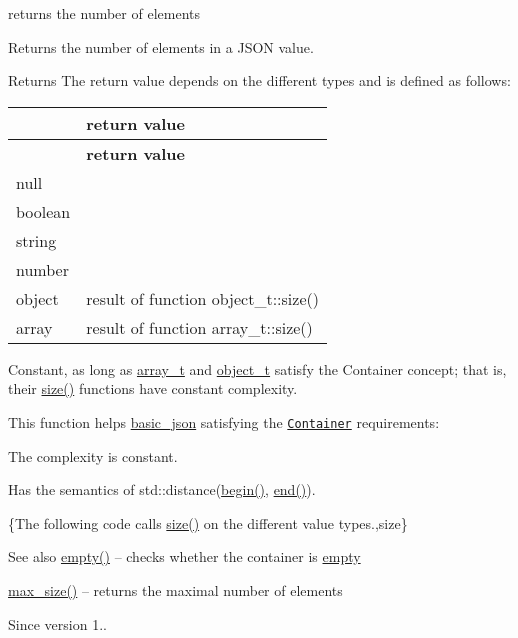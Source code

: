 returns the number of elements 

Returns the number of elements in a J\+S\+ON value.

\begin{DoxyReturn}{Returns}
The return value depends on the different types and is defined as follows\+: \tabulinesep=1mm
\begin{longtabu} spread 0pt [c]{*2{|X[-1]}|}
\hline
{}&{\bf return value  }\\
\endfirsthead
\hline
\endfoot
\hline
{}&{\bf return value  }\\
\endhead
null &{} \\
boolean &{} \\
string &{} \\
number &{} \\
object &result of function object\+\_\+t\+::size() \\
array &result of function array\+\_\+t\+::size() \\
\end{longtabu}
Constant, as long as \hyperlink{a00025_ab00b882d39306d663c23dab110f5cae0}{array\+\_\+t} and \hyperlink{a00025_a0ac9894c9de8dc551cf2e5f1c605537f}{object\+\_\+t} satisfy the Container concept; that is, their \hyperlink{a00025_a01833b332b68d9af1f7cd7a816c39e49}{size()} functions have constant complexity.
\end{DoxyReturn}
This function helps {\ttfamily \hyperlink{a00025}{basic\+\_\+json}} satisfying the \href{http://en.cppreference.com/w/cpp/concept/Container}{\tt Container} requirements\+:
\begin{DoxyItemize}
\item The complexity is constant.
\item Has the semantics of {\ttfamily std\+::distance(\hyperlink{a00025_ad4e381c54039607be08d7af41a1f6ad1}{begin()}, \hyperlink{a00025_a12ccf14d39ddae52f6c7e126105a230b}{end()})}.
\end{DoxyItemize}

\{The following code calls {\ttfamily \hyperlink{a00025_a01833b332b68d9af1f7cd7a816c39e49}{size()}} on the different value types.,size\}

\begin{DoxySeeAlso}{See also}
\hyperlink{a00025_a90239431815c94b0a334f7f4c55eb859}{empty()} -- checks whether the container is \hyperlink{a00025_a90239431815c94b0a334f7f4c55eb859}{empty} 

\hyperlink{a00025_ad5514a7435f246fc5335856465022a7a}{max\+\_\+size()} -- returns the maximal number of elements
\end{DoxySeeAlso}
\begin{DoxySince}{Since}
version 1.. 
\end{DoxySince}
